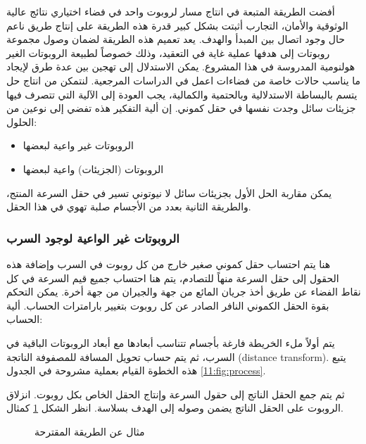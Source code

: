أفضت الطريقة المتبعة في انتاج مسار لروبوت واحد في فضاء اختياري نتائج عالية الوثوقية والأمان، التجارب أثبتت بشكل كبير قدرة هذه الطريقة على إنتاج طريق ناعم حال وجود اتصال بين المبدأ والهدف. يعد تعميم هذه الطريقة لضمان وصول مجموعة روبوتات إلى هدفها عملية غاية في التعقيد، وذلك خصوصاً لطبيعة الروبوتات الغير هولنومية المدروسة في هذا المشروع. يمكن الاستدلال إلى تهجين بين عدة طرق لإيجاد ما يناسب حالات خاصة من فضاءات اعمل في الدراسات المرجعية.
لنتمكن من انتاج حل يتسم بالبساطة الاستدلالية وبالحتمية والكمالية، يجب العودة إلى الآلية التي تتصرف فيها جزيئات سائل وجدت نفسها في حقل كموني. إن ألية التفكير هذه تفضي إلى نوعين من الحلول:

\begin{itemize}
	\item الروبوتات غير واعية لبعضها
	\item الروبوتات (الجزيئات) واعية لبعضها
\end{itemize}

يمكن مقاربة الحل الأول بجزيئات سائل لا نيوتوني تسير في حقل السرعة المنتج، والطريقة الثانية بعدد من الأجسام صلبة تهوي في هذا الحقل.

\subsubsection{الروبوتات غير الواعية لوجود السرب}

هنا يتم احتساب حقل كموني صغير خارج من كل روبوت في السرب وإضافة هذه الحقول إلى حقل السرعة منهاً للتصادم، يتم هنا احتساب جميع قيم السرعة في كل نقاط الفضاء عن طريق أخذ جريان المائع من جهة والجيران من جهة أخرة. يمكن التحكم بقوة الحقل الكموني النافر الصادر عن كل روبوت بتغيير بارامترات الحساب.
ألية الحساب:

يتم أولاً ملء الخريطة فارغة بأجسام تتناسب أبعادها مع أبعاد الروبوتات الباقية في السرب، ثم يتم حساب تحويل المسافة للمصفوفة الناتجة \textenglish{(distance transform).} يتبع هذه الخطوة القيام بعملية مشروحة في الجدول \ref{11:fig:process}.





ثم يتم جمع الحقل الناتج إلى حقول السرعة وإنتاج الحقل الخاص بكل روبوت. انزلاق الروبوت على الحقل الناتج يضمن وصوله إلى الهدف بسلاسة. انظر الشكل \ref{11:fig:square_map} كمثال.

\begin{figure}[htbp]
	\centering
	
	\caption{مثال عن الطريقة المقترحة}
	\label{11:fig:square_map}
\end{figure}


